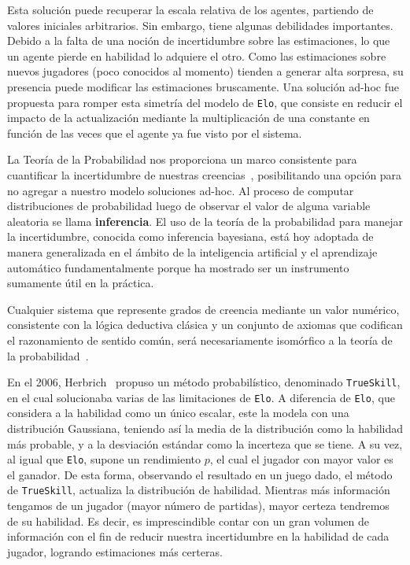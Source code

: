 \documentclass[11pt,twoside, spanish]{report} %
\begin{document}
Esta soluci\'on puede recuperar la escala relativa de los agentes, partiendo de valores iniciales arbitrarios.
Sin embargo, tiene algunas debilidades importantes.
Debido a la falta de una noci\'on de incertidumbre sobre las estimaciones, lo que un agente pierde en habilidad lo adquiere el otro.
Como las estimaciones sobre nuevos jugadores (poco conocidos al momento) tienden a generar alta sorpresa, su presencia puede modificar las estimaciones bruscamente.
Una soluci\'on ad-hoc fue propuesta para romper esta simetr\'ia del modelo de \texttt{Elo}, que consiste en reducir el impacto de la actualizaci\'on mediante la multiplicaci\'on de una constante en funci\'on de las veces que el agente ya fue visto por el sistema.

La Teor\'ia de la Probabilidad nos proporciona un marco consistente para cuantificar la incertidumbre de nuestras creencias~\cite{bishop2006-PRML}, posibilitando una opci\'on para no agregar a nuestro modelo soluciones ad-hoc.
Al proceso de computar distribuciones de probabilidad luego de observar el valor de alguna variable aleatoria se llama \textbf{inferencia}.
El uso de la teor\'ia de la probabilidad para manejar la incertidumbre, conocida como inferencia bayesiana, est\'a hoy adoptada de manera generalizada en el \'ambito de la inteligencia artificial y el aprendizaje autom\'atico fundamentalmente porque ha mostrado ser un instrumento sumamente \'util en la pr\'actica.

Cualquier sistema que represente grados de creencia mediante un valor num\'erico, consistente con la l\'ogica deductiva cl\'asica y un conjunto de axiomas que codifican el razonamiento de sentido com\'un, ser\'a necesariamente isom\'orfico a la teor\'ia de la probabilidad~\cite{Cox1946,vanHorn2003-guideCoxTheorem}.

En el 2006, Herbrich~\cite{Herbrich2007} propuso un m\'etodo probabil\'istico, denominado \texttt{TrueSkill}, en el cual solucionaba varias de las limitaciones de \texttt{Elo}.
A diferencia de \texttt{Elo}, que considera a la habilidad como un \'unico escalar, este la modela con una distribuci\'on Gaussiana, teniendo as\'i la media de la distribuci\'on como la habilidad m\'as probable, y a la desviaci\'on est\'andar como la incerteza que se tiene.
A su vez, al igual que \texttt{Elo}, supone un rendimiento $p$, el cual el jugador con mayor valor es el ganador.
De esta forma, observando el resultado en un juego dado, el m\'etodo de \texttt{TrueSkill}, actualiza la distribuci\'on de habilidad.
Mientras m\'as informaci\'on tengamos de un jugador (mayor n\'umero de partidas), mayor certeza tendremos de su habilidad.
Es decir, es imprescindible contar con un gran volumen de informaci\'on con el fin de reducir nuestra incertidumbre en la habilidad de cada jugador, logrando estimaciones m\'as certeras.
\end{document}
